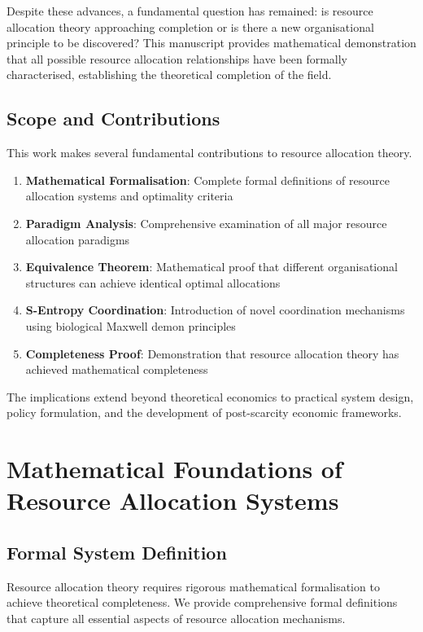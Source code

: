 \documentclass[12pt,a4paper]{article}
\begin{document}
Despite these advances, a fundamental question has remained: is resource allocation theory approaching completion or is there a new organisational principle to be discovered? This manuscript provides mathematical demonstration that all possible resource allocation relationships have been formally characterised, establishing the theoretical completion of the field.

\subsection{Scope and Contributions}

This work makes several fundamental contributions to resource allocation theory.

\begin{enumerate}
\item \textbf{Mathematical Formalisation}: Complete formal definitions of resource allocation systems and optimality criteria
\item \textbf{Paradigm Analysis}: Comprehensive examination of all major resource allocation paradigms
\item \textbf{Equivalence Theorem}: Mathematical proof that different organisational structures can achieve identical optimal allocations
\item \textbf{S-Entropy Coordination}: Introduction of novel coordination mechanisms using biological Maxwell demon principles
\item \textbf{Completeness Proof}: Demonstration that resource allocation theory has achieved mathematical completeness
\end{enumerate}

The implications extend beyond theoretical economics to practical system design, policy formulation, and the development of post-scarcity economic frameworks.

\section{Mathematical Foundations of Resource Allocation Systems}

\subsection{Formal System Definition}

Resource allocation theory requires rigorous mathematical formalisation to achieve theoretical completeness. We provide comprehensive formal definitions that capture all essential aspects of resource allocation mechanisms.
\end{document}
